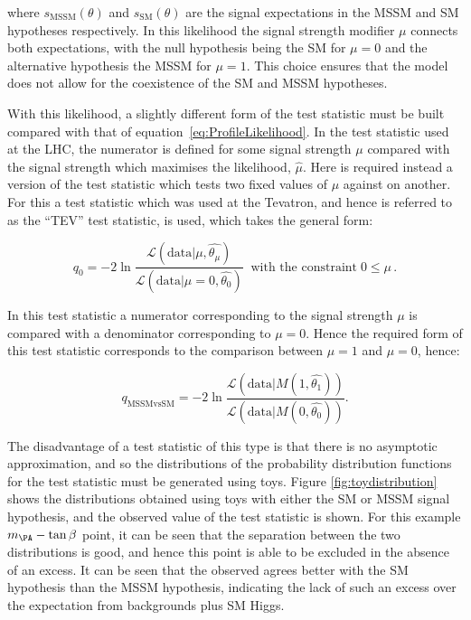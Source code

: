 where $s_{\text{MSSM}}(\theta)$ and $s_{\text{SM}}(\theta)$ are the
signal expectations in the \ac{MSSM} and \ac{SM} hypotheses respectively. In
this likelihood the signal strength modifier $\mu$ connects both expectations,
with the null hypothesis being the \ac{SM} for $\mu=0$ and the alternative
hypothesis the \ac{MSSM} for $\mu=1$. This choice ensures that the model does
not allow for the coexistence of the \ac{SM} and \ac{MSSM} hypotheses. 

With this likelihood, a slightly different form of the test statistic must be
built compared with that of equation~\ref{eq:ProfileLikelihood}. In the test
statistic used at the \ac{LHC}, the numerator is defined for some signal
strength $\mu$ compared with the signal strength which maximises the likelihood,
$\hat{\mu}$. Here is required instead a version of the test statistic which tests
two fixed values of $\mu$ against on another. For this a test statistic
which was used at the Tevatron, and hence is referred to as the ``TEV'' test
statistic, is used, which takes the general form:

\begin{equation}
q_{0} = -2\ln\frac{\mathcal{L}(\text{data}| \mu,\hat{\theta_{\mu}} ) }
{\mathcal{L}(\text{data}|\mu=0,\hat{\theta_{0}})}
\;\; \text{with the constraint} \; 0\leq\mu\, .
\end{equation}

In this test statistic a numerator corresponding to the signal strength $\mu$ is
compared with a denominator corresponding to $\mu=0$. Hence the required form of this
test statistic corresponds to the comparison between
$\mu=1$ and $\mu=0$, hence:

\begin{equation}
q_{\text{MSSMvsSM}} = -2\ln\frac{\mathcal{L}(\text{data}| M(1,\hat{\theta_{1}}) ) }
{\mathcal{L}(\text{data}| M(0,\hat{\theta_{0}}) )}.
\label{eq:qMSSMvsSM}
\end{equation}

The disadvantage of a test statistic of this type is that there is no asymptotic
approximation, and so the distributions of the probability distribution
functions for the test statistic must be generated using toys. Figure
\ref{fig:toydistribution} shows the distributions obtained using toys with
either the \ac{SM} or \ac{MSSM} signal hypothesis, and the observed value of the
test statistic is shown. For this example $m_{\PA}-\tan\beta$ point, it can be
seen that the separation between the two distributions is good, and hence this
point is able to be excluded in the absence of an excess. It can be seen that
the observed agrees better with the \ac{SM} hypothesis than the \ac{MSSM}
hypothesis, indicating the lack of such an excess over the expectation from
backgrounds plus \ac{SM} Higgs. 

